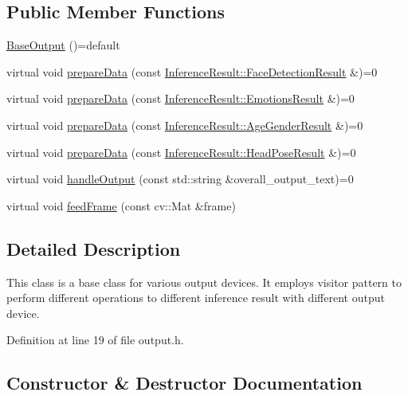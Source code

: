 \subsection*{Public Member Functions}
\begin{DoxyCompactItemize}
\item 
\hyperlink{classBaseOutput_ae88037c3f5a3bd416f3a64e756c75102}{Base\+Output} ()=default
\item 
virtual void \hyperlink{classBaseOutput_ac8e9c0077758e64648fd1bd28661dec7}{prepare\+Data} (const \hyperlink{structInferenceResult_1_1FaceDetectionResult}{Inference\+Result\+::\+Face\+Detection\+Result} \&)=0
\item 
virtual void \hyperlink{classBaseOutput_a67d7a495441233da42b134667a312202}{prepare\+Data} (const \hyperlink{structInferenceResult_1_1EmotionsResult}{Inference\+Result\+::\+Emotions\+Result} \&)=0
\item 
virtual void \hyperlink{classBaseOutput_a6a51c16ebfd7a58829bfa675e562b8f1}{prepare\+Data} (const \hyperlink{structInferenceResult_1_1AgeGenderResult}{Inference\+Result\+::\+Age\+Gender\+Result} \&)=0
\item 
virtual void \hyperlink{classBaseOutput_a3549ade1424963fff201fd946075fd4e}{prepare\+Data} (const \hyperlink{structInferenceResult_1_1HeadPoseResult}{Inference\+Result\+::\+Head\+Pose\+Result} \&)=0
\item 
virtual void \hyperlink{classBaseOutput_ac516cfd7a05af7d710b5dd44d5b79878}{handle\+Output} (const std\+::string \&overall\+\_\+output\+\_\+text)=0
\item 
virtual void \hyperlink{classBaseOutput_acdcbc58abecbf5671b1705937cd1cf02}{feed\+Frame} (const cv\+::\+Mat \&frame)
\end{DoxyCompactItemize}


\subsection{Detailed Description}
This class is a base class for various output devices. It employs visitor pattern to perform different operations to different inference result with different output device. 

Definition at line 19 of file output.\+h.



\subsection{Constructor \& Destructor Documentation}
